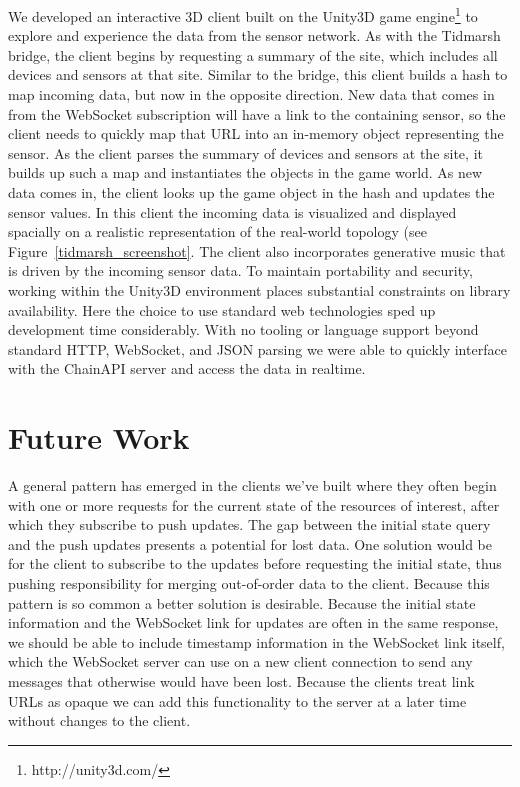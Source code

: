 \documentclass{acm_proc_article-sp}
\begin{document}
We developed an interactive 3D client built on the Unity3D game
engine\footnote{http://unity3d.com/} to explore and experience the data from
the sensor network. As with the Tidmarsh bridge, the client begins by
requesting a summary of the site, which includes all devices and sensors at
that site.  Similar to the bridge, this client builds a hash to map incoming
data, but now in the opposite direction. New data that comes in from the
WebSocket subscription will have a link to the containing sensor, so the client
needs to quickly map that URL into an in-memory object representing the sensor.
As the client parses the summary of devices and sensors at the site, it builds
up such a map and instantiates the objects in the game world. As new data comes
in, the client looks up the game object in the hash and updates the sensor
values. In this client the incoming data is visualized and displayed spacially
on a realistic representation of the real-world topology (see
Figure~\ref{tidmarsh_screenshot}. The client also incorporates generative music
that is driven by the incoming sensor data. To maintain portability and
security, working within the Unity3D environment places substantial constraints
on library availability. Here the choice to use standard web technologies sped up
development time considerably. With no tooling or language support beyond
standard HTTP, WebSocket, and JSON parsing we were able to quickly interface
with the ChainAPI server and access the data in realtime.

\section{Future Work}

A general pattern has emerged in the clients we've built where they often begin
with one or more requests for the current state of the resources of interest,
after which they subscribe to push updates. The gap between the initial state
query and the push updates presents a potential for lost data. One solution
would be for the client to subscribe to the updates before requesting the
initial state, thus pushing responsibility for merging out-of-order data to the
client.  Because this pattern is so common a better solution is desirable.
Because the initial state information and the WebSocket link for updates are
often in the same response, we should be able to include timestamp information
in the WebSocket link itself, which the WebSocket server can use on a new
client connection to send any messages that otherwise would have been lost.
Because the clients treat link URLs as opaque we can add this functionality to
the server at a later time without changes to the client.
\end{document}
